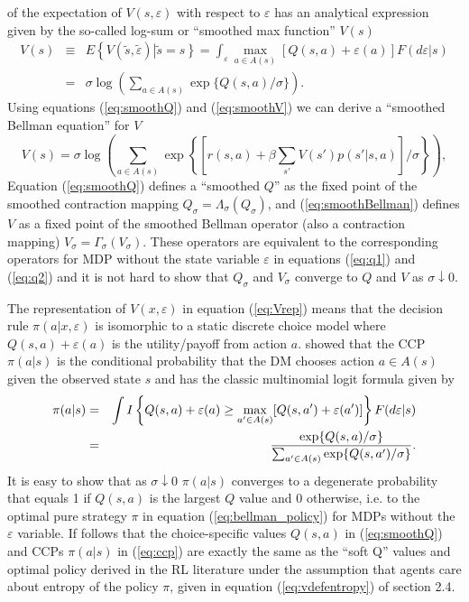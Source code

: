 of the expectation of $V(s,\varepsilon)$ with respect to $\varepsilon$ 
has an  analytical expression given by the so-called log-sum or ``smoothed max function'' $V(s)$ 
\begin{eqnarray}
    V(s) &\equiv &  E\left\{V(\tilde s,\tilde \varepsilon)\left|\tilde s=s\right\}\right. 
    =  \int_\varepsilon \max_{a \in A(s)} \left[Q(s,a)+\varepsilon(a)\right]F(d\varepsilon|s) \nonumber \\ 
    &=&  \sigma \log\left(\sum_{a\in A(s)} \exp\{Q(s,a)/\sigma\}\right).
\label{eq:smoothV}
\end{eqnarray}
Using equations (\ref{eq:smoothQ}) and (\ref{eq:smoothV}) we can derive a ``smoothed Bellman equation'' for $V$
\begin{equation}
    V(s)= \sigma \log\left(\sum_{a\in A(s)} \exp\left\{[r(s,a)+\beta \sum_{s'} V(s')p(s'|s,a)]/\sigma\right\}\right),
 \label{eq:smoothBellman}
\end{equation}
Equation (\ref{eq:smoothQ}) defines a ``smoothed $Q$'' as the fixed point of the smoothed contraction mapping 
$Q_\sigma=\Lambda_\sigma(Q_\sigma)$, and (\ref{eq:smoothBellman}) defines $V$ as a fixed point of the smoothed 
Bellman operator (also a contraction mapping)
$V_\sigma=\Gamma_\sigma(V_\sigma)$. These operators are equivalent  to the corresponding operators for MDP without the state variable
$\varepsilon$ in equations (\ref{eq:q1}) and (\ref{eq:q2}) and it is not hard to show that $Q_\sigma$ and $V_\sigma$ converge
to $Q$ and $V$ as $\sigma \downarrow 0$. 


The representation of $V(x,\varepsilon)$ in equation (\ref{eq:Vrep}) means that the decision rule $\pi(a|x,\varepsilon)$ 
is isomorphic to a static discrete choice model where $Q(s,a)+\varepsilon(a)$ is the utility/payoff from action $a$.
\citet{mcfadden:1973} showed that the CCP $\pi(a|s)$ is the conditional probability that the DM chooses action $a \in A(s)$ 
given the observed state $s$ and has the classic multinomial logit formula  given by
\begin{eqnarray}
     \pi(a|s)  & =& \int I\left\{Q(s,a)+\varepsilon(a) \ge \max_{a' \in A(s)}[Q(s,a')+\varepsilon(a')]\right\}F(d\varepsilon|s)\nonumber \\
 &=&{ \exp\{Q(s,a)/\sigma\} \over \sum_{a' \in A(s)} \exp\{Q(s,a')/\sigma\}}.
\label{eq:ccp}
\end{eqnarray}
It is easy to show that as $\sigma \downarrow 0$ $\pi(a|s)$ converges to a degenerate probability that equals 1 if 
$Q(s,a)$ is the largest $Q$ value  and 0 otherwise, i.e. to the optimal pure strategy $\pi$
 in equation (\ref{eq:bellman_policy}) for MDPs without the  $\varepsilon$ variable.
If follows that the choice-specific values $Q(s,a)$ in (\ref{eq:smoothQ}) and CCPs $\pi(a|s)$ in (\ref{eq:ccp})
are exactly the same as the ``soft Q'' values and optimal policy derived in the RL
literature under the assumption that agents care about entropy of the policy $\pi$, given in equation
(\ref{eq:vdefentropy}) of section 2.4.


